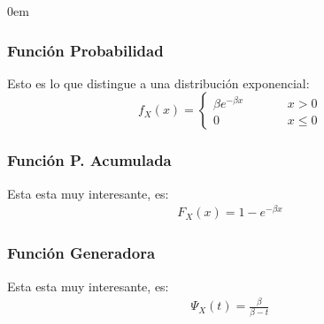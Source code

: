 \documentclass[12pt, fleqn]{report}                             %
\newenvironment{SmallIndentation}[1][0.75em]                    %
        {\begin{adjustwidth}{#1}{}\begin{footnotesize}}             %
        {\end{footnotesize}\end{adjustwidth}}                       %
\DeclareMathOperator \MegaSpace {\quad \quad}                   %
\theoremstyle{break}                                            %
\begin{document}
\begin{multicols}{2}
\begin{SmallIndentation}[0em]
                    \subsubsection{Función Probabilidad}

                        Esto es lo que distingue a una distribución exponencial:
                        \begin{equation*}
                            f_X(x) = 
                                \begin{cases}
                                    \beta e^{-\beta x}  \MegaSpace & x > 0           \\
                                    0                   \MegaSpace & x \leq 0
                                \end{cases}
                        \end{equation*}
                            

                    \subsubsection{Función P. Acumulada}

                        Esta esta muy interesante, es:
                        \begin{align*}
                            F_X(x) = 1 - e^{-\beta x}                
                        \end{align*}


                    \subsubsection{Función Generadora}

                        Esta esta muy interesante, es:
                        \begin{align*}
                            \Psi_X(t) = \frac{\beta}{\beta-t}
                        \end{align*}



\end{SmallIndentation}
\end{multicols}
\end{document}
